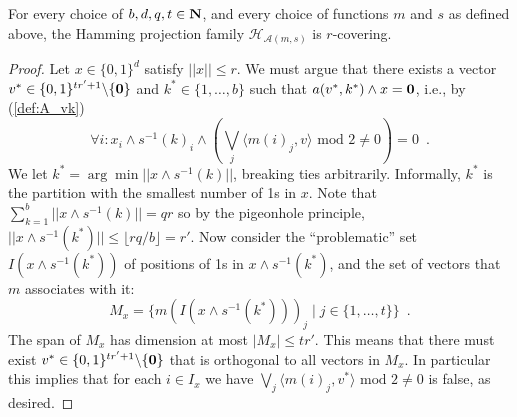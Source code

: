 \documentclass[prodmode,acmtalg]{acmsmall}
\begin{document}
\begin{lemma}\label{lemma:covering2}
For every choice of $b,d,q,t\in {\bf N}$, and every choice of functions $m$ and $s$ as defined above, the Hamming projection family $\mathcal{H}_{\mathcal{A}(m,s)}$ is $r$-covering.
\end{lemma}
\begin{proof}
Let $x\in\{0,1\}^d$ satisfy $||x||\leq r$. 
We must argue that there exists a vector $v^*\in \{0,1\}^{tr'+1}\backslash\{{\bf 0}\}$ and $k^*\in \{1,\dots,b\}$ such that $a(v^*,k^*)\wedge x = {\bf 0}$, i.e., by (\ref{def:A_vk})
$$\forall i: x_i \wedge s^{-1}(k)_i \wedge (\bigvee_j \langle m(i)_j, v\rangle \text{ mod } 2 \ne 0) = 0 \enspace .$$
We let $k^* = \arg\min || x \wedge s^{-1}(k) ||$, breaking ties arbitrarily.
Informally, $k^*$ is the partition with the smallest number of 1s in $x$.
Note that $\sum_{k=1}^b || x \wedge s^{-1}(k) || = qr$ so by the pigeonhole principle, $|| x \wedge s^{-1}(k^*) || \leq \lfloor r q/b \rfloor = r'$.
Now consider the ``problematic'' set $I(x \wedge s^{-1}(k^*))$ of positions of 1s in $x \wedge s^{-1}(k^*)$, and the set of vectors that $m$ associates with it:
$$M_x = \{ m(I(x \wedge s^{-1}(k^*)))_j \; | \; j\in \{1,\dots,t\}\} \enspace .$$
The span of $M_x$ has dimension at most $|M_x| \leq tr'$.
This means that there must exist $v^*\in \{0,1\}^{tr'+1}\backslash\{{\bf 0}\}$ that is orthogonal to all vectors in $M_x$.
In particular this implies that for each $i\in I_x$ we have $\bigvee_j \langle m(i)_j,v^*\rangle \text{ mod 2} \ne 0$ is false, as desired. 
\end{proof}
\end{document}
